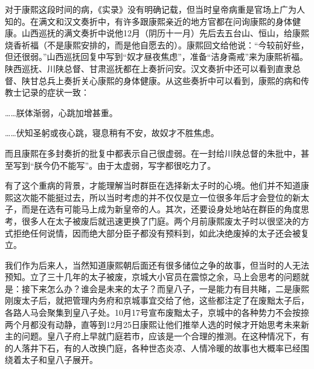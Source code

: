 
对于康熙这段时间的病，《实录》没有明确记载，但当时皇帝病重是官场上广为人知的。在满文和汉文奏折中，有许多跟康熙亲近的地方官都在问询康熙的身体健康。山西巡抚的满文奏折中说他12月（阴历十一月）先后去五台山、恒山，给康熙烧香祈福（不是康熙安排的，而是他自愿去的）。康熙回文给他说：“今较前好些，但还很弱。”山西巡抚回复中写到“奴才昼夜焦虑”，准备“洁身斋戒”来为康熙祈福。陕西巡抚、川陕总督、甘肃巡抚都在上奏折问安。汉文奏折中还可以看到直隶总督、陕甘总兵上奏折关心康熙的身体健康。从这些奏折中可以看到，康熙的病和传教士记录的症状一致：



\begin{bookquote}……朕体渐弱，心跳加增甚重。\end{bookquote}


\begin{bookquote}……伏知圣躬或夜心跳，寝息稍有不安，故奴才不胜焦虑。\end{bookquote}


而且康熙在多封奏折的批复中都表示自己很虚弱。在一封给川陕总督的朱批中，甚至写到“朕今仍不能写”。由于太虚弱，写字都很吃力了。



有了这个重病的背景，才能理解当时群臣在选择新太子时的心境。他们并不知道康熙这次能不能挺过去，所以当时考虑的并不仅仅是立一位很多年后才会登位的新太子，而是在选有可能马上成为新皇帝的人。其次，还要设身处地站在群臣的角度思考，很多人在太子被废后就迅速更换了门庭。两个月前康熙废太子时以很坚决的方式拒绝任何说情，因而绝大部分臣子都没有预料到，如此决绝废掉的太子还会被复立。



我们作为后来人，当然知道康熙朝后面还有很多储位之争的故事，但当时的人无法预知。立了三十几年的太子被废，京城大小官员在震惊之余，马上会思考的问题就是：接下来怎么办？谁会是未来的太子？而皇八子，一是能力有目共睹，二是康熙刚废太子后，就把管理内务府和京城事宜交给了他，这些都注定了在废黜太子后，各路人马会聚集到皇八子处。10月17号宣布废黜太子，京城中的各种势力不会按捺两个月都没有动静，直等到12月25日康熙让他们推举人选的时候才开始思考未来新主的问题。皇八子府上早就门庭若市，应该是一个合理的推测。在这种情况下，有的人落井下石，有的人改换门庭，各种世态炎凉、人情冷暖的故事也大概率已经围绕着太子和皇八子展开。



